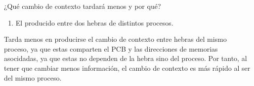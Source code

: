 \begin{ejercicio}\label{ej:2.Ejercicio23}
    ¿Qué cambio de contexto tardará menos y por qué?
    \begin{enumerate}[label=(\alph*)]
      \myitem \textbf{El producido entre dos hebras del mismo proceso.}
      \item El producido entre dos hebras de distintos procesos.
    \end{enumerate}

    Tarda menos en producirse el cambio de contexto entre hebras del mismo proceso, ya que estas comparten el PCB y las direcciones de memorias asocidadas, ya que estas no dependen de la hebra sino del proceso. Por tanto, al tener que cambiar menos información, el cambio de contexto es más rápido al ser del mismo proceso.
\end{ejercicio}



